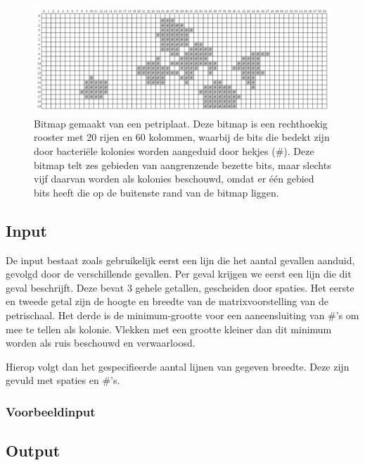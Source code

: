 \documentclass[a4paper]{article}
\begin{document}
\begin{figure}[H]
  \begin{center}
    \centerline{\includegraphics[scale=0.30]{colony_bitmap.png}}
    \caption{Bitmap gemaakt van een petriplaat. Deze bitmap is een rechthoekig
        rooster met 20 rijen en 60 kolommen, waarbij de bits die bedekt zijn
        door bacteri\"ele kolonies worden aangeduid door hekjes (\#). Deze
        bitmap telt zes gebieden van aangrenzende bezette bits, maar slechts
        vijf daarvan worden als kolonies beschouwd, omdat er \'e\'en gebied bits
        heeft die op de buitenste rand van de bitmap liggen.}
  \end{center}
\end{figure}

\subsection*{Input}

De input bestaat zoals gebruikelijk eerst een lijn die het aantal gevallen
aanduid, gevolgd door de verschillende gevallen. Per geval krijgen we eerst een
lijn die dit geval beschrijft. Deze bevat 3 gehele getallen, gescheiden door
spaties. Het eerste en tweede getal zijn de hoogte en breedte van de
matrixvoorstelling van de petrischaal. Het derde is de minimum-grootte voor een
aaneensluiting van \#'s om mee te tellen als kolonie. Vlekken met een grootte
kleiner dan dit minimum worden als ruis beschouwd en verwaarloosd.

Hierop volgt dan het gespecifieerde aantal lijnen van gegeven breedte. Deze zijn
gevuld met spaties en \#'s.

\subsubsection*{Voorbeeldinput}



\subsection*{Output}
\end{document}
